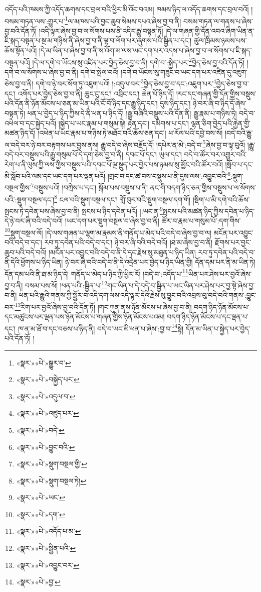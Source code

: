 འདོད་པའི་ཁམས་ཀྱི་འདོད་ཆགས་དང་བྲལ་བའི་ཕྱིར་མི་འོང་བའམ། ཁམས་ཉིད་ལ་འདོད་ཆགས་དང་བྲལ་བའོ། །བསམ་གཏན་ལས་:གྱུར་པ་\footnote{«སྣར་»«པེ་»སྒྱུར་བ་}ལ་མཁས་པའི་བྱང་ཆུབ་སེམས་དཔའ་ཞེས་བྱ་བ་ནི། བསམ་གཏན་ལ་གནས་པ་ཞེས་བྱ་བའི་དོན་ཏོ། །འདི་ལྟར་ཞེས་བྱ་བ་ལ་སོགས་པས་ནི་འདིར་རྒྱུ་བསྟན་ཏོ། །དེ་ལ་གཞན་གྱི་དོན་འབའ་ཞིག་ཡིན་ན་ཇི་སྐད་བསྟན་པ་སྔ་མ་གཉིས་ནི་ཞེས་བྱ་བ་ནི་ལྟ་བ་ལོག་པར་ཞུགས་པའི་སྦྱིན་པ་དང་། ཚུལ་ཁྲིམས་ཉམས་པས་ཆོས་སྟོན་པའོ། །དེ་མ་ཡིན་པ་ཞེས་བྱ་བ་ནི་ས་འོག་མ་ལས་ཡང་དག་པར་འདས་པ་ཞེས་བྱ་བ་ལ་སོགས་པ་ཇི་སྐད་བསྟན་པའོ། །དེ་ལ་དགེ་བ་ཡོངས་སུ་འཛིན་པར་བྱེད་ཅེས་བྱ་བ་ནི། དགེ་བ་:སྐྱེད་པར་\footnote{«སྣར་»«པེ་»བསྐྱེད་པར་}བྱེད་ཅེས་བྱ་བའི་དོན་ཏོ། །དགེ་བ་ལ་སོགས་པ་ཞེས་བྱ་བ་ནི། དགེ་བ་སྤེལ་བའོ། །དགེ་བ་ཡོངས་སུ་གཟུང་བ་ཡང་དག་པར་འཛིན་དུ་འཇུག་ཅེས་བྱ་བ་ནི། དགེ་བ་ཉེ་བར་སོག་ཏུ་འཇུག་པའོ། །:འདུལ་བར་\footnote{«སྣར་»«པེ་»འདུལ་བ་}བྱེད་ཅེས་བྱ་བ་དང་:འཇུག་པར་\footnote{«སྣར་»«པེ་»འཛུད་པར་}བྱེད་ཅེས་བྱ་བ་དང་། འགོད་པར་བྱེད་ཅེས་བྱ་བ་ནི། ཆུང་ངུ་དང་། འབྲིང་དང་། ཆེན་པོ་ཉིད་དོ། །རང་དང་གཞན་གྱི་དོན་གྱིས་བསྡུས་པའི་དོན་ནི་ཉོན་མོངས་པ་ཅན་མ་ཡིན་པའི་ངོ་བོ་ཉིད་དང་རྒྱུ་ཉིད་དང་། དུས་ཉིད་དང་། ཉེ་བར་ཞི་བ་ཉིད་དོ་ཞེས་བསྟན་ཏེ། ཕན་པ་བྱེད་པ་ཉིད་ཀྱིས་དེ་ནི་ཕན་པ་ཉིད་དོ། །རྒྱུ་བཞིའི་བསྡུས་པའི་དོན་ནི། རྒྱུ་རྣམ་པ་གཉིས་ཏེ། བདེ་བ་འཕེལ་བ་དང་སྐྱེད་པའོ། །སྐྱེད་པ་ཡང་རྣམ་པ་གསུམ་སྟེ། རྟེན་དང་། དམིགས་པ་དང་། ལྷན་ཅིག་བྱེད་པའི་རྐྱེན་གྱི་མཚན་ཉིད་དོ། །འཕེན་པ་ཡང་རྣམ་པ་གཉིས་ཏེ་མཐོང་བའི་ཆོས་ཅན་དང་། ཕ་རོལ་པའི་དབྱེ་བས་སོ། །བདེ་བའི་རྒྱུ་ལ་བདེ་བར་ཉེ་བར་བརྟགས་པར་བྱས་ནས། རྒྱུ་བདེ་བ་ཞེས་བརྗོད་དོ། །དཔེར་ན་མེ་:བདེ་བ་\footnote{«སྣར་»«པེ་»བདེ་}ཞེས་བྱ་བ་ལྟ་བུའོ། །རྒྱུ་བདེ་བར་བསྡུས་པའི་རྒྱུ་གསུམ་པོ་དེ་དག་ཅེས་བྱ་བ་ནི། དབང་པོ་དང་། ཡུལ་དང་། བདེ་བ་ཚོར་བར་འགྱུར་བའི་རེག་པ་ནི་ལུས་ཀྱི་ལས་ཀྱིས་བསྡུས་པའི་དབང་པོ་ལྔ་སྡུད་པར་བྱེད་པས་ཉམས་སུ་མྱོང་བའི་ཚོར་བའོ། །སློབ་པ་དང་མི་སློབ་པའི་ལམ་དང་ཡང་དག་པར་ལྡན་པའོ། །གྲང་བ་དང་ཚ་བས་བསྡུས་པ་ནི་དུས་ལས་:འབྱུང་བའི་\footnote{«སྣར་»«པེ་»བྱུང་བའི་}:སྡུག་བསྔལ་གྱིས་\footnote{«སྣར་»«པེ་»སྡུག་བསྔལ་གྱི་}བསྡུས་པའོ། །བཀྲེས་པ་དང་། སྐོམ་པས་བསྡུས་པ་ནི། ནང་གི་བདག་ཉིད་ཅན་གྱིས་བསྡུས་པ་ལ་སོགས་པའི་:སྡུག་བསྔལ་དང་།\footnote{«སྣར་»«པེ་»སྡུག་བསྔལ་ཏེ།} ངལ་བའི་སྡུག་བསྔལ་དང་། གློ་བུར་བའི་སྡུག་བསྔལ་དག་གོ། །སྡིག་པ་མི་དགེ་བའི་ཆོས་སྤངས་ཏེ་དབེན་པས་ཞེས་བྱ་བ་ནི། སྤངས་པ་ཉིད་དབེན་པའོ། །:ཡང་ན་\footnote{«སྣར་»«པེ་»ཡང་}སྤངས་པའི་མཚན་ཉིད་ཀྱིས་དབེན་པ་ཉིད་དེ་ཉེ་བར་ཞི་བའི་བདེ་བའོ། །ཡང་དག་པར་སྡུག་བསྔལ་བ་ཞེས་བྱ་བ་ནི། ཚོར་བ་རྣམ་པ་གསུམ་པོ་:དག་གིས་\footnote{«སྣར་»«པེ་»དག་}སྡུག་བསྔལ་ལོ། །དེ་ལས་གཞན་པ་ལྷག་མ་རྣམས་ནི་གནོད་པ་མེད་པའི་བདེ་བ་ཞེས་བྱ་བ་ལ། མངོན་པར་འབྱུང་བའི་བདེ་བ་དང་། རབ་ཏུ་དབེན་པའི་བདེ་བ་དང་། ཉེ་བར་ཞི་བའི་བདེ་བའོ། །ཐ་མ་ཞེས་བྱ་བ་ནི། རྫོགས་པར་བྱང་ཆུབ་པའི་བདེ་བའོ། །མངོན་པར་འབྱུང་བའི་བདེ་བ་ནི་དེ་དང་རྗེས་སུ་མཐུན་པ་ཉིད་ཡིན། རབ་ཏུ་དབེན་པའི་བདེ་བ་ནི་དེའི་ཕྱོགས་པ་ཉིད་ཡིན། ཉེ་བར་ཞི་བའི་བདེ་བ་ནི་དེ་འདྲེན་པར་བྱེད་པ་ཉིད་ཡིན་གྱི། དོན་དམ་པར་ནི་མ་ཡིན་ཏེ། དོན་དམ་པའི་ནི་ཐ་མ་ཉིད་དེ། གནོད་པ་མེད་པ་ཉིད་ཀྱི་ཕྱིར་རོ། །བདེ་བ་:འདོད་པ་\footnote{«སྣར་»«པེ་»འདོད་པ་མ་}ཡིན་པར་ཤེས་པར་བྱའོ་ཞེས་བྱ་བ་ནི། བསམ་པས་སོ། །ཕན་པའི་:སྦྱིན་པ་\footnote{«སྣར་»«པེ་»སྦྱིན་པའི་}གང་ཡིན་པ་དེ་བདེ་བ་སྦྱིན་པ་ཡང་ཡིན་པར་ཤེས་པར་བྱ་སྟེ་ཞེས་བྱ་བ་ནི། ཕན་པའི་རྒྱུའི་གནས་ཀྱི་སྦྱོར་བ་འདི་དག་ལས་འདི་ལྟར་དེའི་རྗེས་སུ་བྱུང་བའི་འབྲས་བུ་བདེ་བའི་གནས་:བྱུང་བར་\footnote{«སྣར་»«པེ་»འབྱུང་བར་}རིག་པར་བྱའོ་ཞེས་བྱ་བའི་དོན་ཏོ། །གང་ཀུན་ནས་ཉོན་མོངས་པ་ཞེས་བྱ་བ་ནི། བདག་ཉིད་ཉོན་མོངས་པ་དང་མཚུངས་པར་ལྡན་པས་ཉོན་མོངས་པ་གཞན་གྱིས་ཉོན་མོངས་པའམ། བདག་ཉིད་ཉོན་མོངས་པ་དང་ལྡན་པ་དང་། ཁ་ན་མ་ཐོ་བ་དང་བཅས་པ་ཉིད་ནི། བདེ་བ་ཡང་མི་ཕན་པ་ཞེས་:བྱ་བ་\footnote{«སྣར་»«པེ་»བྱ་}སྟེ། དོན་མ་ཡིན་པ་སྐྱེད་པར་བྱེད་པའི་དོན་ཏོ། །
